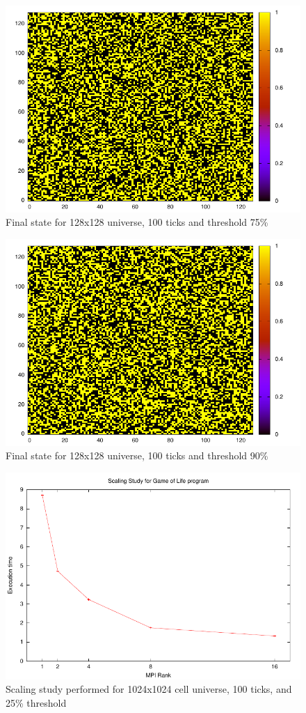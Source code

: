 \documentclass[11pt]{article}
\numberwithin{figure}{section}
\begin{document}
\begin{figure}[t]
\centering
   \includegraphics{plts/gol-128-100-75-16.pdf}
\caption{Final state for 128x128 universe, 100 ticks and threshold 75\%}
\label{fig:75}
\end{figure}
\begin{figure}[t]
\centering
   \includegraphics{plts/gol-128-100-90-16.pdf}
\caption{Final state for 128x128 universe, 100 ticks and threshold 90\%}
\label{fig:90}
\end{figure}
\begin{figure}[t]
\centering
   \includegraphics{plts/scaling.pdf}
\caption{Scaling study performed for 1024x1024 cell universe, 100 ticks, and 25\% threshold}
\label{fig:scaling}
\end{figure}






%

%
\end{document}
